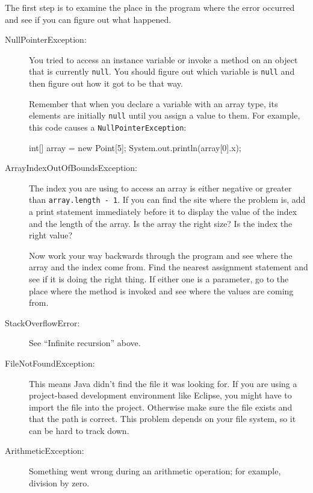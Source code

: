 \documentclass[12pt]{book}
\theoremstyle{exercise}
\newcommand{\java}[1]{\verb"#1"}
\begin{document}
The first step is to examine the place in the program where the error occurred and see if you can figure out what happened.

\begin{description}

\item[NullPointerException:]
You tried to access an instance variable or invoke a method on an object that is currently \java{null}.
You should figure out which variable is \java{null} and then figure out how it got to be that way.

Remember that when you declare a variable with an array type, its elements are initially \java{null} until you assign a value to them.
For example, this code causes a \java{NullPointerException}:

\begin{code}
    int[] array = new Point[5];
    System.out.println(array[0].x);
\end{code}

\item[ArrayIndexOutOfBoundsException:]
The index you are using to access an array is either negative or greater than \java{array.length - 1}.
If you can find the site where the problem is, add a print statement immediately before it to display the value of the index and the length of the array.
Is the array the right size?
Is the index the right value?

Now work your way backwards through the program and see where the array and the index come from.
Find the nearest assignment statement and see if it is doing the right thing.
If either one is a parameter, go to the place where the method is invoked and see where the values are coming from.

\item[StackOverflowError:]
See ``Infinite recursion'' above.

\item[FileNotFoundException:]
This means Java didn't find the file it was looking for.
If you are using a project-based development environment like Eclipse, you might have to import the file into the project.
Otherwise make sure the file exists and that the path is correct.
This problem depends on your file system, so it can be hard to track down.

\item[ArithmeticException:]
Something went wrong during an arithmetic operation; for example, division by zero.

\end{description}
\end{document}
